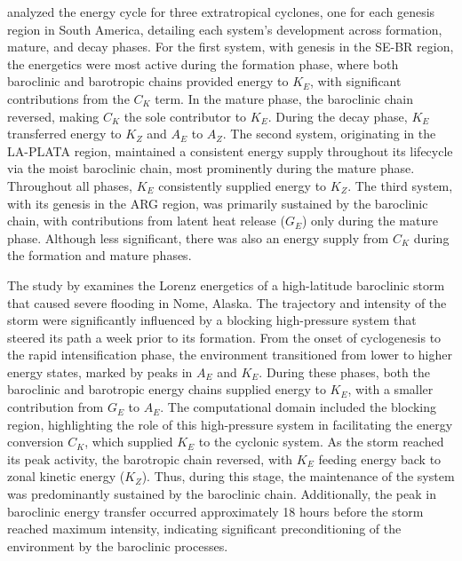 
\citet{dias2011energy} analyzed the energy cycle for three extratropical cyclones, one for each genesis region in South America, detailing each system's development across formation, mature, and decay phases. For the first system, with genesis in the SE-BR region, the energetics were most active during the formation phase, where both baroclinic and barotropic chains provided energy to \(K_E\), with significant contributions from the \(C_K\) term. In the mature phase, the baroclinic chain reversed, making \(C_K\) the sole contributor to \(K_E\). During the decay phase, \(K_E\) transferred energy to \(K_Z\) and \(A_E\) to \(A_Z\). The second system, originating in the LA-PLATA region, maintained a consistent energy supply throughout its lifecycle via the moist baroclinic chain, most prominently during the mature phase. Throughout all phases, \(K_E\) consistently supplied energy to \(K_Z\). The third system, with its genesis in the ARG region, was primarily sustained by the baroclinic chain, with contributions from latent heat release (\(G_E\)) only during the mature phase. Although less significant, there was also an energy supply from \(C_K\) during the formation and mature phases.

The study by \citet{pezza2010environmental} examines the Lorenz energetics of a high-latitude baroclinic storm that caused severe flooding in Nome, Alaska. The trajectory and intensity of the storm were significantly influenced by a blocking high-pressure system that steered its path a week prior to its formation. From the onset of cyclogenesis to the rapid intensification phase, the environment transitioned from lower to higher energy states, marked by peaks in \(A_E\) and \(K_E\). During these phases, both the baroclinic and barotropic energy chains supplied energy to \(K_E\), with a smaller contribution from \(G_E\) to \(A_E\). The computational domain included the blocking region, highlighting the role of this high-pressure system in facilitating the energy conversion \(C_K\), which supplied \(K_E\) to the cyclonic system. As the storm reached its peak activity, the barotropic chain reversed, with \(K_E\) feeding energy back to zonal kinetic energy (\(K_Z\)). Thus, during this stage, the maintenance of the system was predominantly sustained by the baroclinic chain. Additionally, the peak in baroclinic energy transfer occurred approximately 18 hours before the storm reached maximum intensity, indicating significant preconditioning of the environment by the baroclinic processes.


